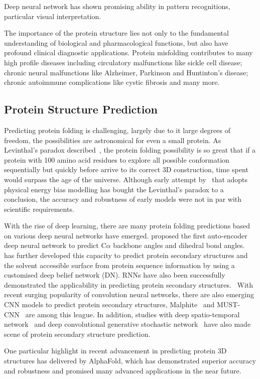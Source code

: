 Deep neural network has shown promising ability in pattern recognitions, particular visual interpretation.
\par 
The importance of the protein structure lies not only to the fundamental understanding of biological and pharmacological functions, but also have profound clinical diagnostic applications. Protein misfolding contributes to many high profile diseases including circulatory malfunctions like sickle cell disease; chronic neural malfunctions like Alzheimer, Parkinson and Huntinton's disease; chronic autoimmune complications like cystic fibrosis and many more.~\cite{Hammarstrom_2003,Chiti_2006,Selkoe_2003}  
\par 

\subsection{Protein Structure Prediction}
Predicting protein folding is challenging, largely due to it large degrees of freedom, the possibilities are astronomical for even a small protein. As Levinthal's paradox described~\cite{LEV69}, the protein folding possibility is so great that if a protein with 100 amino acid residues to explore all possible conformation sequentially but quickly before arrive to its correct 3D construction, time spent would surpass the age of the universe. Although early attempt by~\citet{Zwanzig_1992} that adopts physical energy bias modelling has bought the Levinthal's paradox to a conclusion, the accuracy and robustness of early models were not in par with scientific requirements.  
\par 
With the rise of deep learning, there are many protein folding predictions based on various deep neural networks have emerged. \citet{Lyons_2014} proposed the first auto-encoder deep neural network to predict C$\alpha$ backbone angles and dihedral bond angles.~\citet{Heffernan_2015} has further developed this capacity to predict protein secondary structures and the solvent accessible surface from protein sequence information by using a customised deep belief network (DN). RNNs have also been successfully demonstrated the applicability in predicting protein secondary structures.~\cite{Baldi2000,Baldi1999,Pollastri2002} With recent surging popularity of convolution neural networks, there are also emerging CNN models to predict protein secondary structures, Malphite~\cite{Yang_Li_2015} and MUST-CNN~\cite{LinLQ16} are among this league. In addition, studies with deep spatio-temporal network~\cite{NIPS2012_4526} and deep convolutional generative stochastic network~\cite{2014arXiv1403.1347Z} have also made scene of protein secondary structure prediction.  

One particular highlight in recent advancement in predicting protein 3D structures has delivered by AlphaFold, which has demonstrated superior accuracy and robustness and promised many advanced applications in the near future. 
\par 